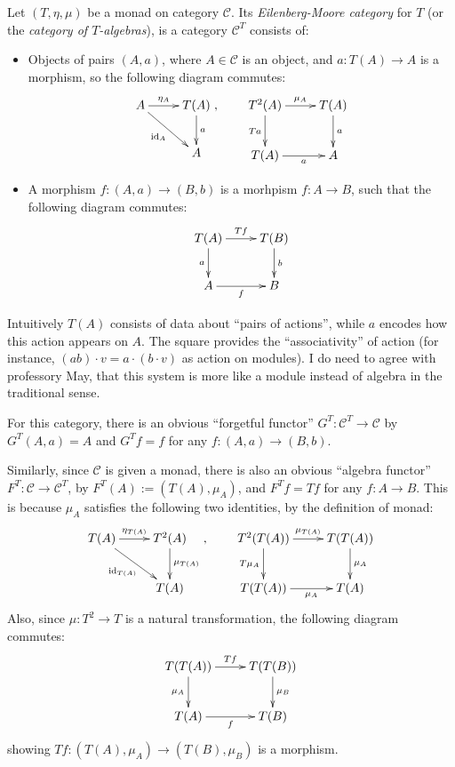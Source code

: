 \documentclass{article}
\begin{document}
\begin{defn}
    Let $(T,\eta, \mu)$ be a monad on category $\mathcal{C}$. Its \emph{Eilenberg-Moore category} for $T$ (or the \emph{category of $T$-algebras}), is a category $\mathcal{C}^T$ consists of:
    \begin{itemize}
        \item Objects of pairs $(A,a)$, where $A\in\mathcal{C}$ is an object, and $a:T(A)\rightarrow A$ is a morphism, so the following diagram commutes:
        \[\xymatrix{
            A \ar[dr]_-{\id_A} \ar[r]^-{\eta_A} & T(A) \ar[d]^-{a}\\
            & A
        },\quad\quad \xymatrix{
            T^2(A) \ar[r]^-{\mu_A} \ar[d]_-{Ta} & T(A) \ar[d]^-{a}\\
            T(A) \ar[r]_-{a} & A
        }\]
        \item A morphism $f:(A,a)\rightarrow (B,b)$ is a morhpism $f:A\rightarrow B$, such that the following diagram commutes:
        \[\xymatrix{
            T(A) \ar[d]_-{a} \ar[r]^-{Tf} & T(B)\ar[d]^-{b}\\
            A \ar[r]_-{f} & B
        }\]
    \end{itemize}
\end{defn}

Intuitively $T(A)$ consists of data about ``pairs of actions'', while $a$ encodes how this action appears on $A$. The square provides the ``associativity'' of action (for instance, $(ab)\cdot v = a\cdot (b\cdot v)$ as action on modules). I do need to agree with professory May, that this system is more like a module instead of algebra in the traditional sense.

\hfil

For this category, there is an obvious ``forgetful functor'' $G^T:\mathcal{C}^T\rightarrow \mathcal{C}$ by $G^T (A,a) = A$ and $G^T f = f$ for any $f:(A,a)\rightarrow (B,b)$. 

Similarly, since $\mathcal{C}$ is given a monad, there is also an obvious ``algebra functor'' $F^T:\mathcal{C}\rightarrow \mathcal{C}^T$, by $F^T(A) := (T(A),\mu_A)$, and $F^Tf = Tf$ for any $f:A\rightarrow B$. This is because $\mu_A$ satisfies the following two identities, by the definition of monad:
\[\xymatrix{
    T(A) \ar[dr]_-{\id_{T(A)}} \ar[r]^-{\eta_{T(A)}} & T^2(A) \ar[d]^-{\mu_{T(A)}}\\
    & T(A)
},\quad\quad \xymatrix{
    T^2(T(A)) \ar[r]^-{\mu_{T(A)}} \ar[d]_-{T\mu_A} & T(T(A)) \ar[d]^-{\mu_A}\\
    T(T(A)) \ar[r]_-{\mu_A} & T(A)
}\]
Also, since $\mu:T^2\rightarrow T$ is a natural transformation, the following diagram commutes:
\[\xymatrix{
    T(T(A)) \ar[d]_-{\mu_A} \ar[r]^-{Tf} & T(T(B))\ar[d]^-{\mu_B}\\
    T(A) \ar[r]_-{f} & T(B)
}\]
showing $Tf:(T(A),\mu_A)\rightarrow (T(B),\mu_B)$ is a morphism.
\end{document}
